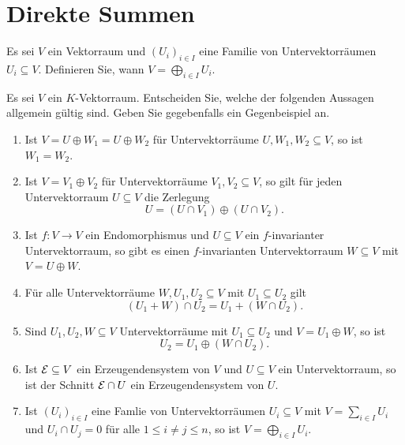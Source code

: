 \section{Direkte Summen}







\begin{question}[subtitle = Definition der direkten Summe]{1}
  Es sei $V$ ein Vektorraum und $(U_i)_{i \in I}$ eine Familie von Untervektorräumen $U_i \subseteq V$.
  Definieren Sie, wann $V = \bigoplus_{i \in I} U_i$.
\end{question}







\begin{question}[subtitle = Multiple Choice für Direkte Summen]{2}
  Es sei $V$ ein $K$-Vektorraum.
  Entscheiden Sie, welche der folgenden Aussagen allgemein gültig sind.
  Geben Sie gegebenfalls ein Gegenbeispiel an.
  \begin{enumerate}[leftmargin=*]
    \item
      Ist $V = U \oplus W_1 = U \oplus W_2$ für Untervektorräume $U, W_1, W_2 \subseteq V$, so ist $W_1 = W_2$.
    \item
      Ist $V = V_1 \oplus V_2$ für Untervektorräume $V_1, V_2 \subseteq V$, so gilt für jeden Untervektorraum $U \subseteq V$ die Zerlegung
      \[
        U = (U \cap V_1) \oplus (U \cap V_2).
      \]
    \item
      Ist $f \colon V \to V$ ein Endomorphismus und $U \subseteq V$ ein $f$-invarianter Untervektorraum, so gibt es einen $f$-invarianten Untervektorraum $W \subseteq V$ mit $V = U \oplus W$.
    \item
      Für alle Untervektorräume $W, U_1, U_2 \subseteq V$ mit $U_1 \subseteq U_2$ gilt
      \[
        (U_1 + W) \cap U_2 =  U_1 + (W \cap U_2).
      \]
    \item
      Sind $U_1, U_2, W \subseteq V$ Untervektorräume mit $U_1 \subseteq U_2$ und $V = U_1 \oplus W$, so ist
      \[
        U_2 = U_1 \oplus (W \cap U_2).
      \]
    \item
      Ist $\mathcal{E} \subseteq V$ ein Erzeugendensystem von $V$ und $U \subseteq V$ ein Untervektorraum, so ist der Schnitt $\mathcal{E} \cap U$ ein Erzeugendensystem von $U$.
    \item
      Ist $(U_i)_{i \in I}$ eine Famlie von Untervektorräumen $U_i \subseteq V$ mit $V = \sum_{i \in I} U_i$ und $U_i \cap U_j = 0$ für alle $1 \leq i \neq j \leq n$, so ist $V = \bigoplus_{i \in I} U_i$.
  \end{enumerate}
\end{question}





